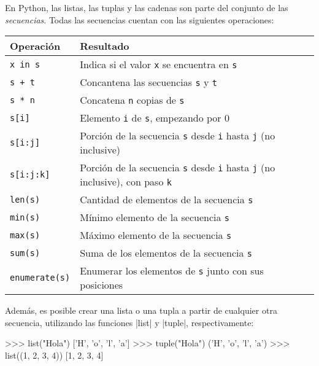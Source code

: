 \begin{sabias_que}
En Python, las listas, las tuplas y las cadenas son parte del conjunto
de las \emph{secuencias}.  Todas las secuencias cuentan con las siguientes
operaciones:

\vspace{\medskipamount}
\begin{tabular}{l l}
{\bf Operación} & {\bf Resultado} \\
\hline
\lstinline!x in s! & Indica si el valor \lstinline!x! se encuentra en
    \lstinline!s! \\
\lstinline!s + t! & Concantena las secuencias \lstinline!s! y \lstinline!t! \\
\lstinline!s * n! & Concatena \lstinline!n! copias de \lstinline!s! \\
\lstinline!s[i]! & Elemento \lstinline!i! de \lstinline!s!, empezando por 0 \\
\lstinline!s[i:j]! & Porción de la secuencia \lstinline!s! desde
	\lstinline!i! hasta \lstinline!j! (no inclusive) \\
\lstinline!s[i:j:k]! & Porción de la secuencia \lstinline!s! desde
	\lstinline!i! hasta \lstinline!j! (no inclusive), con paso \lstinline!k!  \\
\lstinline!len(s)! & Cantidad de elementos de la secuencia \lstinline!s!  \\
\lstinline!min(s)! & Mínimo elemento de la secuencia \lstinline!s! \\
\lstinline!max(s)! & Máximo elemento de la secuencia \lstinline!s! \\
\lstinline!sum(s)! & Suma de los elementos de la secuencia \lstinline!s! \\
\lstinline!enumerate(s)! & Enumerar los elementos de \lstinline!s! junto con sus posiciones \\
\end{tabular}
\vspace{\medskipamount}

Además, es posible crear una lista o una tupla a partir de cualquier otra
secuencia, utilizando las funciones |list| y |tuple|, respectivamente:

\begin{codigo-python-sn}
>>> list("Hola")
['H', 'o', 'l', 'a']
>>> tuple("Hola")
('H', 'o', 'l', 'a')
>>> list((1, 2, 3, 4))
[1, 2, 3, 4]
\end{codigo-python-sn}
\end{sabias_que}



